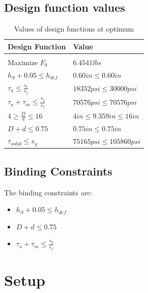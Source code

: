 \documentclass{article}
\begin{document}
\subsection{Design function values}
\begin{table}[H]
\centering
\caption{Values of design functions at optimum}
\label{my-label}
\begin{tabular}{ll}
\hline
\textbf{Design Function}                       & \textbf{Value} \\
\hline\\
Maximize $F_{0}$                               & $6.4541 lbs$                    \\
$h_{S} + 0.05 \leq h_{def}$                    & $0.60 in \leq 0.60 in$          \\
$\tau_{a} \leq \frac{s_{e}}{s_{f}}$            & $18352 psi \leq 30000 psi$      \\
$\tau_{a} + \tau_{m} \leq \frac{s_{y}}{s_{f}}$ & $70576 psi \leq 70576psi$       \\
$4 \geq \frac{D}{d} \leq 16$                   & $4 in \leq 9.359 in \leq 16 in$ \\
$D + d \leq 0.75$                              & $0.75 in \leq 0.75in$           \\
$\tau_{solid} \leq s_{y}$                      & $75165 psi \leq 105860 psi$     \\
\hline  
\end{tabular}
\end{table}
\subsection{Binding Constraints}
The binding constraints are:
\begin{itemize}
    \item $h_{S} + 0.05 \leq h_{def}$
    \item $D + d \leq 0.75$
    \item $\tau_{a} + \tau_{m} \leq \frac{s_{y}}{s_{f}}$
\end{itemize}


\newpage
\section{Setup}
\end{document}
